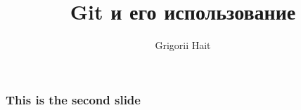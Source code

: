 \documentclass[]{beamer}
\title{Git и его использование}
\author{Grigorii Hait}
\begin{document}
    
    \begin{frame}
        \frametitle{This is the second slide}        
    \end{frame}
\end{document}
